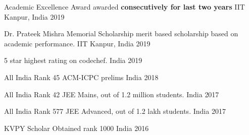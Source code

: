 



\begin{cvhonors}

  \cvhonor
    {Academic Excellence Award} %
    {awarded \textbf{consecutively for last two years}} %
    {IIT Kanpur, India} %
    {2019} %

  \cvhonor
    {Dr. Prateek Mishra Memorial Scholarship} %
    {merit based scholarship based on academic performance.} %
    {IIT Kanpur, India} %
    {2019} %


  \cvhonor
    {5 star} %
    {highest rating on codechef.} %
    {India} %
    {2019} %

  \cvhonor
    {All India Rank 45} %
    {ACM-ICPC prelims} %
    {India} %
    {2018} %

    
  \cvhonor
    {All India Rank 42} %
    {JEE Mains, out of 1.2 million students.} %
    {India} %
    {2017} %

  \cvhonor
    {All India Rank 577} %
    {JEE Advanced, out of 1.2 lakh students.} %
    {India} %
    {2017} %







  \cvhonor
    {KVPY Scholar} %
    {Obtained rank 1000} %
    {India} %
    {2016} %

\end{cvhonors}
